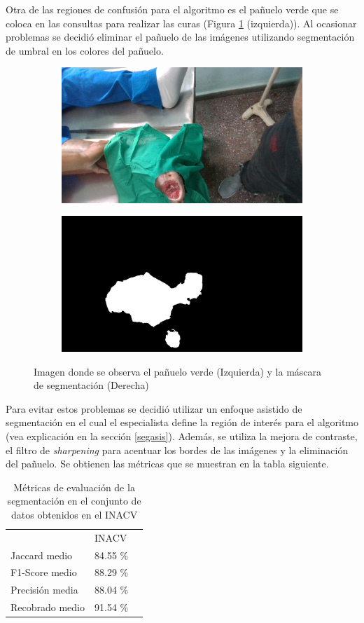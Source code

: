 Otra de las regiones de confusión para el algoritmo es el pañuelo verde que se coloca en las consultas para realizar las curas (Figura \ref{fig:tissueMask} (izquierda)). Al ocasionar problemas se decidió eliminar el pañuelo de las imágenes utilizando segmentación de umbral en los colores del pañuelo. 

\begin{figure}
	\centering
	\begin{subfigure}
		\centering
		\includegraphics[width=.4\linewidth]{./Graphics/tissue.jpg}
	\end{subfigure}
	\begin{subfigure}
		\centering
		\includegraphics[width=.4\linewidth]{./Graphics/tissueMask.jpg}
	\end{subfigure}
	\caption{Imagen donde se observa el pañuelo verde (Izquierda) y la máscara de segmentación (Derecha)}
	\label{fig:tissueMask}
\end{figure}

Para evitar estos problemas se decidió utilizar un enfoque asistido de segmentación en el cual el especialista define la región de interés para el algoritmo (vea explicación en la sección \ref{segasis}). Además, se utiliza la mejora de contraste, el filtro de \textit{sharpening} para acentuar los bordes de las imágenes y la eliminación del pañuelo. Se obtienen las métricas que se muestran en la tabla siguiente.

\begin{table}[ht]
	\centering
	\begin{tabular}{lll}
		\hhline{===}
		& INACV\\
		\hhline{===}
		Jaccard medio & 84.55 \% \\ \hline
		F1-Score medio & 88.29 \% \\ \hline
		Precisión media& 88.04 \% \\
		\hline
		Recobrado medio & 91.54 \% \\
		\hline
	\end{tabular}
	\caption{Métricas de evaluación de la segmentación en el conjunto de datos obtenidos en el INACV}
	\label{tab:metricSegm}
\end{table}


